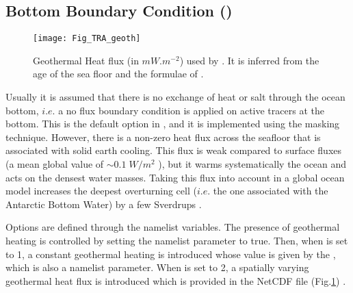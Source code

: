 \documentclass[NEMO_book]{subfiles}
\begin{document}
\subsection   [Bottom Boundary Condition (\textit{trabbc})]
			{Bottom Boundary Condition ()}
\label{TRA_bbc}
\begin{figure}[!t] 	  \begin{center}
\texttt{[image: Fig\_TRA\_geoth]}
\caption{ 	\label{Fig_geothermal}
Geothermal Heat flux (in $mW.m^{-2}$) used by \cite{Emile-Geay_Madec_OS09}.
It is inferred from the age of the sea floor and the formulae of \citet{Stein_Stein_Nat92}.}
\end{center}   \end{figure}

Usually it is assumed that there is no exchange of heat or salt through 
the ocean bottom, $i.e.$ a no flux boundary condition is applied on active 
tracers at the bottom. This is the default option in \NEMO, and it is 
implemented using the masking technique. However, there is a 
non-zero heat flux across the seafloor that is associated with solid 
earth cooling. This flux is weak compared to surface fluxes (a mean 
global value of $\sim0.1\;W/m^2$ \citep{Stein_Stein_Nat92}), but it warms 
systematically the ocean and acts on the densest water masses. 
Taking this flux into account in a global ocean model increases
the deepest overturning cell ($i.e.$ the one associated with the Antarctic 
Bottom Water) by a few Sverdrups  \citep{Emile-Geay_Madec_OS09}. 

Options are defined through the   namelist variables.
The presence of geothermal heating is controlled by setting the namelist 
parameter   to true. Then, when  is set to 1, 
a constant geothermal heating is introduced whose value is given by the 
, which is also a namelist parameter. 
When   is set to 2, a spatially varying geothermal heat flux is 
introduced which is provided in the  NetCDF file 
(Fig.\ref{Fig_geothermal}) \citep{Emile-Geay_Madec_OS09}.
\end{document}
